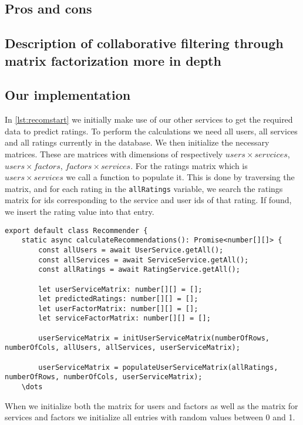 \subsection{Pros and cons}


\subsection{Description of collaborative filtering through matrix factorization more in depth}

\subsection{Our implementation}
In \autoref{lst:recomstart} we initially make use of our other services to get the required data to predict ratings.
To perform the calculations we need all users, all services and all ratings currently in the database.
We then initialize the necessary matrices.
These are matrices with dimensions of respectively $users \times servcices$, $users \times factors$, $factors \times services$. 
For the ratings matrix which is $users \times services$ we call a function to populate it.
This is done by traversing the matrix, and for each rating in the \texttt{allRatings} variable, we search the ratings matrix for ids corresponding to the service and user ids of that rating.
If found, we insert the rating value into that entry.
\begin{lstlisting}[caption={The start of the recommender}, captionpos=b, label={lst:recomstart}]
export default class Recommender {
    static async calculateRecommendations(): Promise<number[][]> {
        const allUsers = await UserService.getAll();
        const allServices = await ServiceService.getAll();
        const allRatings = await RatingService.getAll();
    
        let userServiceMatrix: number[][] = [];
        let predictedRatings: number[][] = [];
        let userFactorMatrix: number[][] = [];
        let serviceFactorMatrix: number[][] = [];

        userServiceMatrix = initUserServiceMatrix(numberOfRows, numberOfCols, allUsers, allServices, userServiceMatrix);

		userServiceMatrix = populateUserServiceMatrix(allRatings, numberOfRows, numberOfCols, userServiceMatrix);
    \dots
\end{lstlisting}
When we initialize both the matrix for users and factors as well as the matrix for services and factors we initialize all entries with random values between 0 and 1.

